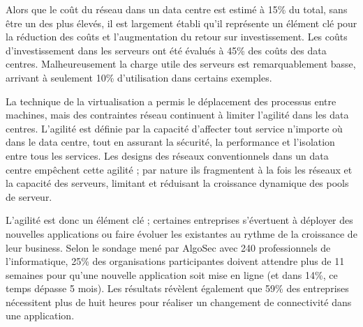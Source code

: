 \par
Alors que le coût du réseau dans un data centre est estimé à 15\% du total, sans être un des plus élevés, il est largement établi qu'il représente un élément clé pour la réduction des coûts et l'augmentation du retour sur investissement. Les coûts d'investissement dans les serveurs ont été évalués à 45\% des coûts des data centres. Malheureusement la charge utile des serveurs est remarquablement basse, arrivant à seulement 10\% d'utilisation dans certains exemples.  \cite{cloudCosts}

\par 
La technique de la virtualisation a permis le déplacement des processus entre machines, mais des contraintes réseau continuent à limiter l'agilité dans les data centres. L'agilité est définie par la capacité d'affecter tout service n'importe où dans le data centre, tout en assurant la sécurité, la performance et l'isolation entre tous les services. Les designs des réseaux conventionnels dans un data centre empêchent cette agilité ; par nature ils fragmentent  à la fois les réseaux et la capacité des serveurs, limitant et réduisant la croissance dynamique des pools de serveur. \cite{cloudCostsAgility}



\par 
L'agilité est donc un élément clé ; certaines entreprises s'évertuent à déployer des nouvelles applications ou faire évoluer les existantes au rythme de la croissance de leur business. Selon le sondage mené par AlgoSec avec 240 professionnels de l'informatique, 25\% des organisations participantes doivent attendre plus de 11 semaines pour qu'une nouvelle application soit mise en ligne (et dans 14\%, ce temps dépasse 5 mois). Les résultats révèlent également que 59\% des entreprises nécessitent plus de huit heures pour réaliser un changement de connectivité dans une application. \cite{algoSecSurvey}


